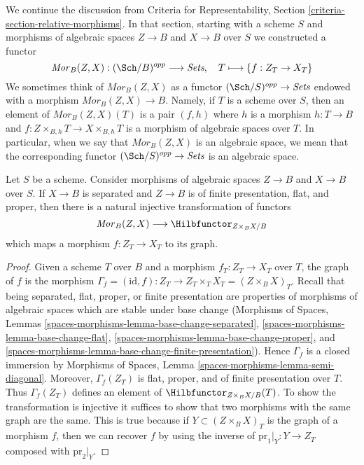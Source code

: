 \noindent
We continue the discussion from Criteria for Representability, Section
\ref{criteria-section-relative-morphisms}.
In that section, starting with a scheme $S$ and morphisms
of algebraic spaces $Z \to B$ and $X \to B$ over $S$
we constructed a functor
$$
\mathit{Mor}_B(Z, X) : (\Sch/B)^{opp} \longrightarrow \textit{Sets}, \quad
T \longmapsto \{f : Z_T \to X_T\}
$$
We sometimes think of $\mathit{Mor}_B(Z, X)$
as a functor $(\Sch/S)^{opp} \to \textit{Sets}$ endowed with a morphism
$\mathit{Mor}_B(Z, X) \to B$.
Namely, if $T$ is a scheme over $S$, then an element
of $\mathit{Mor}_B(Z, X)(T)$ is a pair $(f, h)$
where $h$ is a morphism $h : T \to B$
and $f : Z \times_{B, h} T \to X \times_{B, h} T$
is a morphism of algebraic spaces over $T$. In particular, when we say
that $\mathit{Mor}_B(Z, X)$ is an algebraic space, we mean that the
corresponding functor $(\Sch/S)^{opp} \to \textit{Sets}$ is an algebraic space.

\begin{lemma}
\label{lemma-Mor-into-Hilb}
Let $S$ be a scheme. Consider morphisms
of algebraic spaces $Z \to B$ and $X \to B$ over $S$.
If $X \to B$ is separated and $Z \to B$ is
of finite presentation, flat, and proper,
then there is a natural
injective transformation of functors
$$
\mathit{Mor}_B(Z, X) \longrightarrow \Hilbfunctor_{Z \times_B X/B}
$$
which maps a morphism $f : Z_T \to X_T$ to its graph.
\end{lemma}

\begin{proof}
Given a scheme $T$ over $B$ and a morphism $f_T : Z_T \to X_T$
over $T$, the graph of $f$ is the morphism
$\Gamma_f = (\text{id}, f) : Z_T \to Z_T \times_T X_T = (Z \times_B X)_T$.
Recall that being separated, flat, proper, or finite presentation
are properties of morphisms of algebraic spaces which are stable
under base change (Morphisms of Spaces, Lemmas
\ref{spaces-morphisms-lemma-base-change-separated},
\ref{spaces-morphisms-lemma-base-change-flat},
\ref{spaces-morphisms-lemma-base-change-proper}, and
\ref{spaces-morphisms-lemma-base-change-finite-presentation}).
Hence $\Gamma_f$ is a closed immersion by
Morphisms of Spaces, Lemma \ref{spaces-morphisms-lemma-semi-diagonal}.
Moreover, $\Gamma_f(Z_T)$ is flat, proper, and of finite presentation over $T$.
Thus $\Gamma_f(Z_T)$ defines an element of $\Hilbfunctor_{Z \times_B X/B}(T)$.
To show the transformation is injective it suffices to show that
two morphisms with the same graph are the same. This is true because
if $Y \subset (Z \times_B X)_T$ is the graph of a morphism $f$, then
we can recover $f$ by using the inverse of $\text{pr}_1|_Y : Y \to Z_T$
composed with $\text{pr}_2|_Y$.
\end{proof}


